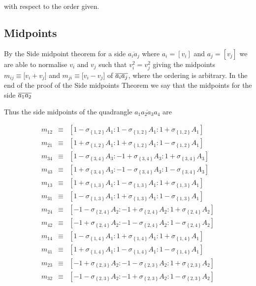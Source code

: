 \documentclass[11pt]{article}
\begin{document}
\bigskip with respect to the order given.

\subsection{Midpoints}

By the Side midpoint theorem for a side $\overline{a_{i}a_{j}}$ where $%
a_{i}=[v_{i}]$ and $a_{j}=[v_{j}]$ we are able to normalise $v_{i}$ and $%
v_{j}$ such that $v_{i}^{2}=v_{j}^{2}$ giving the midpoints $m_{ij}\equiv
\lbrack v_{i}+v_{j}]$ and $m_{ji}\equiv \lbrack v_{i}-v_{j}]$ of $\overline{%
a_{i}a_{j}}$, where the ordering is arbitrary. In the end of the proof of
the Side midpoints Theorem we say that the midpoints for the side $\overline{%
a_{1}a_{2}}$ 

Thus the side midpoints of the quadrangle $\overline{a_{1}a_{2}a_{3}a_{4}}$
are

\begin{eqnarray*}
m_{12} &\equiv &\left[ 1-\sigma _{\left\{ 1,2\right\} }A_{1}:1-\sigma
_{\left\{ 1,2\right\} }A_{1}:1+\sigma _{\left\{ 1,2\right\} }A_{1}\right] \\
m_{21} &\equiv &\left[ 1+\sigma _{\left\{ 1,2\right\} }A_{1}:1+\sigma
_{\left\{ 1,2\right\} }A_{1}:1-\sigma _{\left\{ 1,2\right\} }A_{1}\right] \\
m_{34} &\equiv &\left[ 1-\sigma _{\left\{ 3,4\right\} }A_{3}:-1+\sigma
_{\left\{ 3,4\right\} }A_{3}:1+\sigma _{\left\{ 3,4\right\} }A_{3}\right] \\
m_{43} &\equiv &\left[ 1+\sigma _{\left\{ 3,4\right\} }A_{3}:-1-\sigma
_{\left\{ 3,4\right\} }A_{3}:1-\sigma _{\left\{ 3,4\right\} }A_{3}\right] \\
m_{13} &\equiv &\left[ 1+\sigma _{\left\{ 1,3\right\} }A_{1}:1-\sigma
_{\left\{ 1,3\right\} }A_{1}:1+\sigma _{\left\{ 1,3\right\} }A_{1}\right] \\
m_{31} &\equiv &\left[ 1-\sigma _{\left\{ 1,3\right\} }A_{1}:1+\sigma
_{\left\{ 1,3\right\} }A_{1}:1-\sigma _{\left\{ 1,3\right\} }A_{1}\right] \\
m_{24} &\equiv &\left[ -1-\sigma _{\left\{ 2,4\right\} }A_{2}:-1+\sigma
_{\left\{ 2,4\right\} }A_{2}:1+\sigma _{\left\{ 2,4\right\} }A_{2}\right] \\
m_{42} &\equiv &\left[ -1+\sigma _{\left\{ 2,4\right\} }A_{2}:-1-\sigma
_{\left\{ 2,4\right\} }A_{2}:1-\sigma _{\left\{ 2,4\right\} }A_{2}\right] \\
m_{14} &\equiv &\left[ 1-\sigma _{\left\{ 1,4\right\} }A_{1}:1+\sigma
_{\left\{ 1,4\right\} }A_{1}:1+\sigma _{\left\{ 1,4\right\} }A_{1}\right] \\
m_{41} &\equiv &\left[ 1+\sigma _{\left\{ 1,4\right\} }A_{1}:1-\sigma
_{\left\{ 1,4\right\} }A_{1}:1-\sigma _{\left\{ 1,4\right\} }A_{1}\right] \\
m_{23} &\equiv &\left[ -1+\sigma _{\left\{ 2,3\right\} }A_{2}:-1-\sigma
_{\left\{ 2,3\right\} }A_{2}:1+\sigma _{\left\{ 2,3\right\} }A_{2}\right] \\
m_{32} &\equiv &\left[ -1-\sigma _{\left\{ 2,3\right\} }A_{2}:-1+\sigma
_{\left\{ 2,3\right\} }A_{2}:1-\sigma _{\left\{ 2,3\right\} }A_{2}\right]
\end{eqnarray*}
\end{document}
